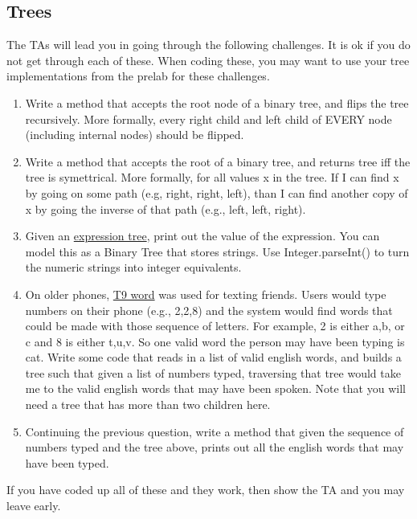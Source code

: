 \documentclass[paper=a4, fontsize=11pt, parskip=full]{scrartcl} %
\numberwithin{equation}{section} %
\numberwithin{figure}{section} %
\numberwithin{table}{section} %
\begin{document}
\subsection{Trees}

The TAs will lead you in going through the following challenges. It is ok if you do not get through each of these. When coding these, you may want to use your tree implementations from the prelab for these challenges.

\begin{enumerate}
	\item Write a method that accepts the root node of a binary tree, and flips the tree recursively. More formally, every right child and left child of EVERY node (including internal nodes) should be flipped.
	\item Write a method that accepts the root of a binary tree, and returns tree iff the tree is symettrical. More formally, for all values x in the tree. If I can find x by going on some path (e.g, right, right, left), than I can find another copy of x by going the inverse of that path (e.g., left, left, right).
	\item Given an \href{https://en.wikipedia.org/wiki/Binary_expression_tree}{expression tree}, print out the value of the expression. You can model this as a Binary Tree that stores strings. Use Integer.parseInt() to turn the numeric strings into integer equivalents.
	\item On older phones, \href{https://en.wikipedia.org/wiki/T9_(predictive_text)}{T9 word} was used for texting friends. Users would type numbers on their phone (e.g., 2,2,8) and the system would find words that could be made with those sequence of letters. For example, 2 is either a,b, or c and 8 is either t,u,v. So one valid word the person may have been typing is cat. Write some code that reads in a list of valid english words, and builds a tree such that given a list of numbers typed, traversing that tree would take me to the valid english words that may have been spoken. Note that you will need a tree that has more than two children here.
	\item Continuing the previous question, write a method that given the sequence of numbers typed and the tree above, prints out all the english words that may have been typed.
\end{enumerate}

If you have coded up all of these and they work, then show the TA and you may leave early.


\end{document}
